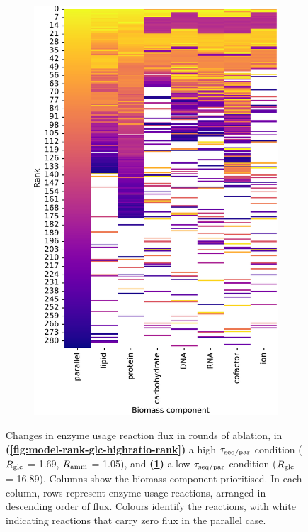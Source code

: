 \begin{figure}
\begin{subfigure}[t]{0.45\textwidth}
    \includegraphics[width=\linewidth]{CompareEnzUse_glc16p89_pyrUnres_ammUnres_1.pdf}
    \caption{
    }
    \label{fig:model-rank-glc-lowratio-rank}
  \end{subfigure}%

  \caption[
    Changes in enzyme usage reaction flux in rounds of ablation (glucose-ammonium)
  ]{
    Changes in enzyme usage reaction flux in rounds of ablation, in  \textbf{(\ref{fig:model-rank-glc-highratio-rank})} a high $\tau_{\mathrm{seq}/\mathrm{par}}$ condition ($R_{\mathrm{glc}}$ = \SI{1.69}{\mmolgdwh}, $R_{\mathrm{amm}}$ = \SI{1.05}{\mmolgdwh}), and \textbf{(\ref{fig:model-rank-glc-lowratio-rank})} a low $\tau_{\mathrm{seq}/\mathrm{par}}$ condition ($R_{\mathrm{glc}}$ = \SI{16.89}{\mmolgdwh}).
    Columns show the biomass component prioritised.
    In each column, rows represent enzyme usage reactions, arranged in descending order of flux.
    Colours identify the reactions, with white indicating reactions that carry zero flux in the parallel case.
  }
  \label{fig:model-rank-glc-rank}
\end{figure}

